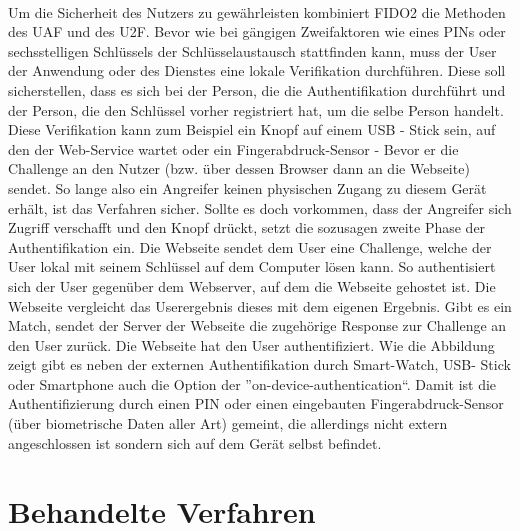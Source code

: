 \\
Um die Sicherheit des Nutzers zu gewährleisten kombiniert FIDO2 die Methoden des UAF und des U2F. Bevor wie bei gängigen Zweifaktoren wie eines PINs oder sechsstelligen Schlüssels der Schlüsselaustausch stattfinden kann, muss der User der Anwendung oder des Dienstes eine lokale Verifikation durchführen. Diese soll sicherstellen, dass es sich bei der Person, die die Authentifikation durchführt und der Person, die den Schlüssel vorher registriert hat, um die selbe Person handelt. Diese Verifikation kann zum Beispiel ein Knopf auf einem USB - Stick sein, auf den der Web-Service wartet oder ein Fingerabdruck-Sensor - Bevor er die Challenge an den Nutzer (bzw. über dessen Browser dann an die Webseite) sendet. So lange also ein Angreifer keinen physischen Zugang zu diesem Gerät erhält, ist das Verfahren sicher. Sollte es doch vorkommen, dass der Angreifer sich Zugriff verschafft und den Knopf drückt, setzt die sozusagen zweite Phase der Authentifikation ein. Die Webseite sendet dem User eine Challenge, welche der User lokal mit seinem Schlüssel auf dem Computer lösen kann. So authentisiert sich der User gegenüber dem Webserver, auf dem die Webseite gehostet ist. Die Webseite vergleicht das Userergebnis dieses mit dem eigenen Ergebnis. Gibt es ein Match, sendet der Server der Webseite die zugehörige Response zur Challenge an den User zurück. Die Webseite hat den User authentifiziert. Wie die Abbildung zeigt gibt es neben der externen Authentifikation durch Smart-Watch, USB- Stick oder Smartphone auch die Option der ''on-device-authentication``. Damit ist die Authentifizierung durch einen PIN oder einen eingebauten Fingerabdruck-Sensor (über biometrische Daten aller Art) gemeint, die allerdings nicht extern angeschlossen ist sondern sich auf dem Gerät selbst befindet.

\section{Behandelte Verfahren}

